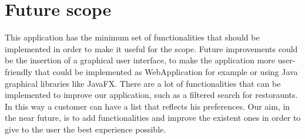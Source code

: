 \chapter{Future scope}
This application has the minimum set of functionalities that should be implemented in order to make it useful for the scope.
Future improvements could be the insertion of a graphical user interface, to make the application more user-friendly that could be implemented as WebApplication for example or using Java graphical libraries like JavaFX.
There are a lot of functionalities that can be implemented to improve our application, such as a filtered search for restoraunts. In this way a customer can have a list that reflects his preferences.
Our aim, in the near future, is to add functionalities and improve the existent ones in order to give to the user the best experience possible.
